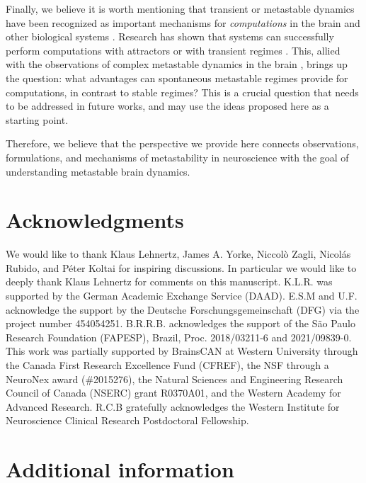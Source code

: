 Finally, we believe it is worth mentioning that transient or metastable dynamics have been recognized as important mechanisms for \textit{computations} in the brain \cite{fonollosa2015learning, lacamera2019cortical, wang202150, laje2013robust, mazor2005transient, sussillo2013opening} and other biological systems \cite{nandan2023non, nandan2022cells}. Research has shown that systems can successfully perform computations with attractors \cite{khona2022attractor} or with transient regimes \cite{mazor2005transient,buonomano2009state, laje2013robust, khona2022attractor, benigno2023waves, budzinski2023an, liboni2023image}. This, allied with the observations of complex metastable dynamics in the brain \cite{brinkman2022metastable}, brings up the question: what advantages can spontaneous metastable regimes provide for computations, in contrast to stable regimes? This is a crucial question that needs to be addressed in future works, and may use the ideas proposed here as a starting point.

Therefore, we believe that the perspective we provide here connects observations, formulations, and mechanisms of metastability in neuroscience with the goal of understanding metastable brain dynamics. 


\section*{Acknowledgments}
We would like to thank Klaus Lehnertz, James A. Yorke, Niccolò Zagli, Nicolás Rubido, and Péter Koltai for inspiring discussions. In particular we would like to deeply thank Klaus Lehnertz for comments on this manuscript. K.L.R. was supported by the German Academic Exchange Service (DAAD). E.S.M and U.F. acknowledge the support by the Deutsche Forschungsgemeinschaft (DFG) via the project number 454054251. B.R.R.B. acknowledges the support of the São Paulo Research Foundation (FAPESP), Brazil, Proc. 2018/03211-6 and 2021/09839-0. This work was partially supported by BrainsCAN at Western University through the Canada First Research Excellence Fund (CFREF), the NSF through a NeuroNex award (\#2015276), the Natural Sciences and Engineering Research Council of Canada (NSERC) grant R0370A01, and the Western Academy for Advanced Research. R.C.B gratefully acknowledges the Western Institute for Neuroscience Clinical Research Postdoctoral Fellowship.

\section*{Additional information}
